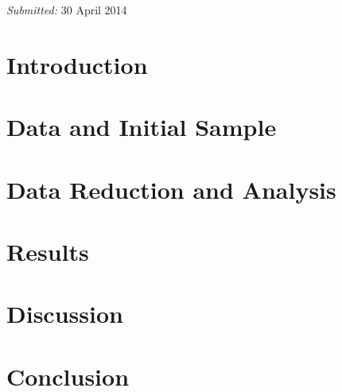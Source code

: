 \documentclass[12pt, preprint]{aastex}
\begin{document}
\begin{titlepage}


{\emph{Submitted: }\large{30 April 2014}}\\[1cm] %

\begin{centering}
\end{centering}

 

\vfill %

\end{titlepage}


\begin{abstract}
	
\end{abstract}
\maketitle
\tableofcontents

\section{Introduction}
	
\section{Data and Initial Sample}
	
\section{Data Reduction and Analysis}
	
\section{Results}
	
\section{Discussion}
	
\section{Conclusion}
	


\end{document}
